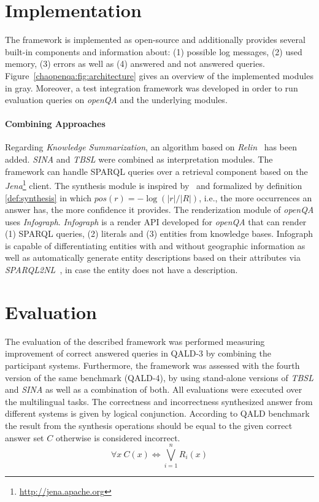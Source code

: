 \section{Implementation}
\label{chaopenqa:sec:impl}

The framework is implemented as open-source and additionally provides several built-in components and information about: (1) possible log messages, (2) used memory, (3) errors as well as (4) answered and not answered queries.
Figure~\ref{chaopenqa:fig:architecture} gives an overview of the implemented modules in gray.
Moreover, a test integration framework was developed in order to run evaluation queries on \emph{openQA} and the underlying modules.

\paragraph{\textbf{Combining Approaches}}
\vspace{-4.0mm}
Regarding \emph{Knowledge Summarization}, an algorithm based on \emph{Relin}~\cite{cheng2011relin} has been added.
\emph{SINA} and \emph{TBSL} were combined as interpretation modules.
The framework can handle SPARQL queries over a retrieval component based on the \emph{Jena}\footnote{\url{http://jena.apache.org}} client.
The synthesis module is inspired by~\cite{conf/aswc/LopezNFSUM09} and formalized by definition \ref{def:synthesis} in which $pos(r) = - \log(|r|/|R|)$, i.e., the more occurrences an answer has, the more confidence it provides.
The renderization module of \emph{openQA} uses \emph{Infograph}.
\emph{Infograph} is a render API developed for \emph{openQA} that can render (1) SPARQL queries, (2) literals and (3) entities from knowledge bases.
Infograph is capable of differentiating entities with and without geographic information as well as automatically generate entity descriptions based on their attributes via \emph{SPARQL2NL}~\cite{sparql2nl-demo}, in case the entity does not have a description.

\section{Evaluation}
\label{chaopenqa:sec:eval}

The evaluation of the described framework was performed measuring improvement of correct answered queries in QALD-3 by combining the participant systems.
Furthermore, the framework was assessed with the fourth version of the same benchmark (QALD-4), by using stand-alone versions of \emph{TBSL} and \emph{SINA} as well as a combination of both.
All evaluations were executed over the multilingual tasks.
The correctness and incorrectness synthesized answer from different systems is given by logical conjunction.
According to QALD benchmark the result from the synthesis operations should be equal to the given correct answer set $C$ otherwise is considered incorrect.
\[\forall x \ C(x) \iff \bigvee_{i=1}^n R_i(x)\]

